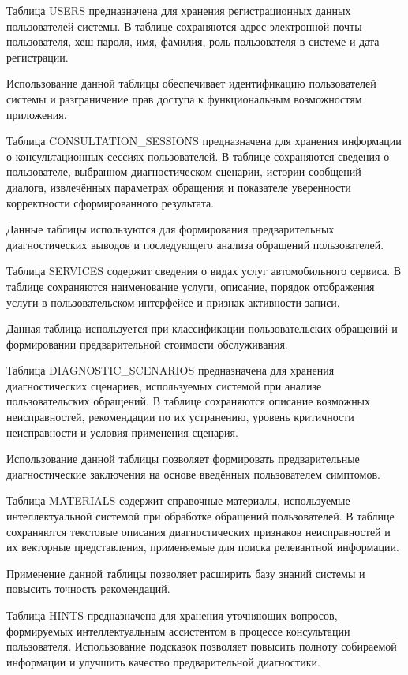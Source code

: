 \documentclass[14pt,a4paper]{extarticle}
\numberwithin{figure}{section}
\numberwithin{table}{section}
\begin{document}
Таблица USERS предназначена для хранения регистрационных данных
пользователей системы. В таблице сохраняются адрес электронной почты
пользователя, хеш пароля, имя, фамилия, роль пользователя в системе и
дата регистрации.

Использование данной таблицы обеспечивает идентификацию пользователей
системы и разграничение прав доступа к функциональным возможностям
приложения.

Таблица CONSULTATION\_SESSIONS предназначена для хранения информации о
консультационных сессиях пользователей. В таблице сохраняются сведения о
пользователе, выбранном диагностическом сценарии, истории сообщений
диалога, извлечённых параметрах обращения и показателе уверенности
корректности сформированного результата.

Данные таблицы используются для формирования предварительных
диагностических выводов и последующего анализа обращений пользователей.

Таблица SERVICES содержит сведения о видах услуг автомобильного сервиса.
В таблице сохраняются наименование услуги, описание, порядок отображения
услуги в пользовательском интерфейсе и признак активности записи.

Данная таблица используется при классификации пользовательских обращений
и формировании предварительной стоимости обслуживания.

Таблица DIAGNOSTIC\_SCENARIOS предназначена для хранения диагностических
сценариев, используемых системой при анализе пользовательских обращений.
В таблице сохраняются описание возможных неисправностей, рекомендации по
их устранению, уровень критичности неисправности и условия применения
сценария.

Использование данной таблицы позволяет формировать предварительные
диагностические заключения на основе введённых пользователем симптомов.

Таблица MATERIALS содержит справочные материалы, используемые
интеллектуальной системой при обработке обращений пользователей. В
таблице сохраняются текстовые описания диагностических признаков
неисправностей и их векторные представления, применяемые для поиска
релевантной информации.

Применение данной таблицы позволяет расширить базу знаний системы и
повысить точность рекомендаций.

Таблица HINTS предназначена для хранения уточняющих вопросов,
формируемых интеллектуальным ассистентом в процессе консультации
пользователя. Использование подсказок позволяет повысить полноту
собираемой информации и улучшить качество предварительной диагностики.
\end{document}
